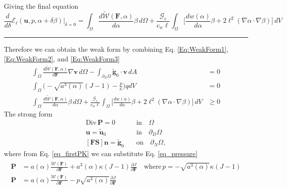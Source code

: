 \documentclass[12pt,3p]{article}
\numberwithin{equation}{section}
\begin{document}
Giving the final equation
\begin{equation}\label{Eq:WeakForm3}
\frac{d}{d \delta} \mathcal{E}_\ell (\bm{u}, p, \alpha + \delta \beta) \big\rvert_{\delta = 0} = \int_\Omega \frac{d \widetilde{\mathcal{W}}(\mathbf{F}, \alpha)}{d \alpha} \beta \, d\Omega + \frac{\mathcal{G}_c}{c_w \ell} \int_\Omega \bigg[ \frac{d w(\alpha)}{d \alpha} \beta + 2 \ell^2 (\nabla \alpha \cdot \nabla \beta) \bigg] \, dV 
\end{equation}
\noindent\rule{\linewidth}{0.5pt} %
Therefore we can obtain the weak form by combining Eq. \ref{Eq:WeakForm1}, \ref{Eq:WeakForm2}, and \ref{Eq:WeakForm3}
\begin{subequations}\label{WeakForm}
\begin{align}
\int_\Omega \frac{d \widetilde{\mathcal{W}}(\mathbf{F}, \alpha)}{d \mathbf{F}} \nabla \bm{v} \, d\Omega -  \int_{\partial_N\Omega} {\tilde{\bm{g}}}_0 \cdot \bm{v} \, dA &= 0 \\
\int_\Omega \bigg( - \sqrt{a^3(\alpha)} (J - 1) - \frac{p}{\kappa} \bigg) q dV &= 0 \\
\int_\Omega \frac{d \widetilde{\mathcal{W}}(\mathbf{F}, \alpha)}{d \alpha} \beta \, d\Omega + \frac{\mathcal{G}_c}{c_w \ell} \int_\Omega \bigg[ \frac{d w(\alpha)}{d \alpha} \beta + 2 \ell^2 (\nabla \alpha \cdot \nabla \beta) \bigg] \, dV &\geq 0 
\end{align}
\end{subequations}
The strong form
\begin{subequations}\label{StrongForm}
\begin{align}
\text{Div} \, \mathbf{P} = 0 \quad &\text{in} \quad \Omega \\
\mathbf{u} = \widetilde{\mathbf{u}}_0 \quad &\text{in} \quad \partial_{D}\Omega \\
\left[\mathbf{FS}\right]\bm{n} = {\tilde{\bm{g}}}_0 \quad &\text{on} \quad \partial_{N}\Omega,
\end{align}
\end{subequations}
where from Eq. \ref{eq_firstPK} we can substitute Eq. \ref{eq_pressure}
\begin{align*}
\begin{split}
\mathbf{P} &= a(\alpha) \frac{\mathcal{W}(\mathbf{F})}{\partial \mathbf{F}} + a^3(\alpha)\kappa\left(J-1\right)\frac{\partial J}{\partial \mathbf{F}} \quad \text{where} \, p=-\sqrt{a^3(\alpha)}\kappa\left(J-1\right) \\
\mathbf{P} &= a(\alpha) \frac{\mathcal{W}(\mathbf{F})}{\partial \mathbf{F}} - p \sqrt{a^3(\alpha)} \frac{\partial J}{\partial \mathbf{F}} 
\end{split}
\end{align*}
\end{document}

